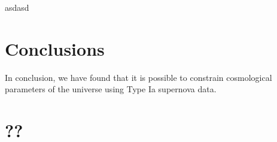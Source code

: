 \documentclass[twocolumn]{revtex4}
\begin{document}
asdasd

\vspace{-5ex}
\section{Conclusions}
\vspace{-2ex}

In conclusion, we have found that it is possible to constrain cosmological parameters of the universe using Type Ia supernova data.

\vspace{-3ex}



\clearpage
\appendix

\vfill
\twocolumngrid
\vspace{-3ex}
\section{??}
\vspace{-2ex}



\clearpage
\end{document}
